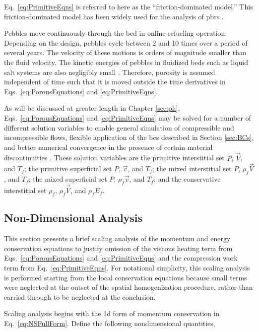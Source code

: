 \noindent Eq.\ \eqref{eq:PrimitiveEqns} is referred to here as the ``friction-dominated model.'' This friction-dominated model has been widely used for the analysis of \glspl{pbr} \cite{hossain, nouri, tecdoc1163}.  

Pebbles move continuously through the bed in online refueling operation. Depending on the design, pebbles cycle between 2 and 10 times over a period of several years. The velocity of these motions is orders of magnitude smaller than the fluid velocity. The kinetic energies of pebbles in fluidized beds such as liquid salt systems are also negligibly small \cite{mardus_hall}. Therefore, porosity is assumed independent of time such that it is moved outside the time derivatives in Eqs.\ \eqref{eq:PorousEquations} and \eqref{eq:PrimitiveEqns}.

As will be discussed at greater length in Chapter \ref{sec:ph}, Eqs.\ \eqref{eq:PorousEquations} and \eqref{eq:PrimitiveEqns} may be solved for a number of different solution variables to enable general simulation of compressible and incompressible flows, flexible application of the \glspl{bc} described in Section \ref{sec:BCs}, and better numerical convergence in the presence of certain material discontinuities \cite{hauke_1998}. These solution variables are the primitive interstitial set \(P\), \(\vec{V}\), and \(T_f\); the primitive superficial set \(P\), \(\vec{v}\), and \(T_f\); the mixed interstitial set \(P\), \(\rho_f\vec{V}\), and \(T_f\); the mixed superficial set \(P\), \(\rho_f\vec{v}\), and \(T_f\); and the conservative interstitial set \(\rho_f\), \(\rho_f\vec{V}\), and \(\rho_fE_f\).

\subsection{Non-Dimensional Analysis}
\label{sec:NonDim}

This section presents a brief scaling analysis of the momentum and energy conservation equations to justify omission of the viscous heating term from Eqs.\ \eqref{eq:PorousEquations} and \eqref{eq:PrimitiveEqns} and the compression work term from Eq.\ \eqref{eq:PrimitiveEqns}. For notational simplicity, this scaling analysis is performed starting from the local conservation equations because small terms were neglected at the outset of the spatial homogenization procedure, rather than carried through to be neglected at the conclusion.

Scaling analysis begins with the \gls{1d} form of momentum conservation in Eq.\ \eqref{eq:NSFullForm}. Define the following nondimensional quantities,

